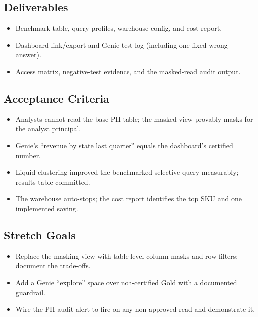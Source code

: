 \subsection*{Deliverables}
\begin{itemize}
    \item Benchmark table, query profiles, warehouse config, and cost report.
    \item Dashboard link/export and Genie test log (including one fixed wrong answer).
    \item Access matrix, negative-test evidence, and the masked-read audit output.
\end{itemize}

\subsection*{Acceptance Criteria}
\begin{itemize}
    \item Analysts cannot read the base PII table; the masked view provably masks for the analyst principal.
    \item Genie's ``revenue by state last quarter'' equals the dashboard's certified number.
    \item Liquid clustering improved the benchmarked selective query measurably; results table committed.
    \item The warehouse auto-stops; the cost report identifies the top SKU and one implemented saving.
\end{itemize}

\subsection*{Stretch Goals}
\begin{itemize}
    \item Replace the masking view with table-level column masks and row filters; document the trade-offs.
    \item Add a Genie ``explore'' space over non-certified Gold with a documented guardrail.
    \item Wire the PII audit alert to fire on any non-approved read and demonstrate it.
\end{itemize}
